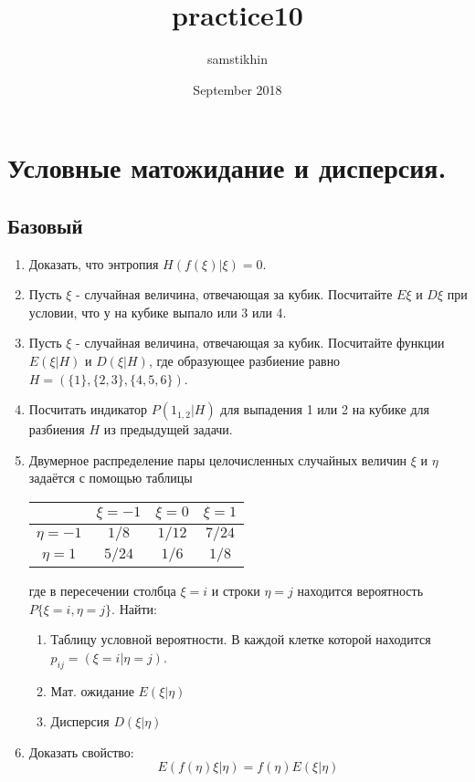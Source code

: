 \documentclass[a4paper, 14pt]{extarticle}
\title{practice10}
\author{samstikhin}
\date{September 2018}
\begin{document}
\section*{Условные матожидание и дисперсия.}
\subsection*{Базовый}
\begin{enumerate}

\item Доказать, что энтропия $H(f(\xi)|\xi) = 0$.

\item Пусть $\xi$ - случайная величина, отвечающая за кубик. Посчитайте $E\xi$ и $D\xi$ при условии, что у на кубике выпало или 3 или 4.

\item Пусть $\xi$ - случайная величина, отвечающая за кубик. Посчитайте функции $E(\xi|H)$ и $D(\xi|H)$, где образующее разбиение равно $H = (\{1\}, \{2,3\}, \{4,5,6\})$.

\item Посчитать индикатор $P(1_{1,2}|H)$ для выпадения 1 или 2 на кубике для разбиения $H$ из предыдущей задачи. 

\item 
Двумерное распределение пары целочисленных случайных величин $\xi$ и $\eta$ задаётся с помощью таблицы

\begin{center}
\begin{tabular}{|c|c|c|c|}
\hline
 & $\xi = -1$ & $\xi = 0$ & $\xi = 1$\\
\hline
$\eta = -1$ & $1/8$ & $1/12$ & $7/24$\\ 
\hline
$\eta = 1$ & $5/24$ & $1/6$ & $1/8$\\ 
\hline
\end{tabular}


\end{center}
где в пересечении столбца $\xi = i$ и строки $\eta = j$ находится вероятность $P\lbrace{\xi = i, \eta = j\rbrace}$. Найти:

\begin{enumerate}
    \item Таблицу условной вероятности. В каждой клетке которой находится $p_{ij} = (\xi=i|\eta=j)$.
    \item Мат. ожидание $E(\xi|\eta)$
    \item Дисперсия $D(\xi|\eta)$
\end{enumerate}

\item Доказать свойство:
    $$E(f(\eta)\xi|\eta) = f(\eta)E(\xi|\eta)$$

\end{enumerate}
\newpage
\end{document}
